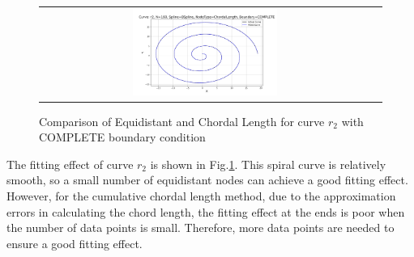 \documentclass[a4paper]{article}
\begin{document}
\begin{sloppypar}
\begin{figure}[H]
\begin{tabular}{cc}
    \includegraphics[width=0.45\textwidth]{../figure/problemE/N_160_r2_BSpline_ChordalLength_COMPLETE.png} \\
  \end{tabular}
  \renewcommand{\figurename}{Fig.}
  \caption{Comparison of Equidistant and Chordal Length for curve \(r_2\) with COMPLETE boundary condition}
  \label{fig:r2_nodeType_compare}
\end{figure}

The fitting effect of curve \(r_2\) is shown in
Fig.\ref{fig:r2_nodeType_compare}. This spiral curve is relatively smooth, so a
small number of equidistant nodes can achieve a good fitting effect. However,
for the cumulative chordal length method, due to the approximation errors in
calculating the chord length, the fitting effect at the ends is poor when the
number of data points is small. Therefore, more data points are needed to
ensure a good fitting effect.


\end{sloppypar}
\end{document}
